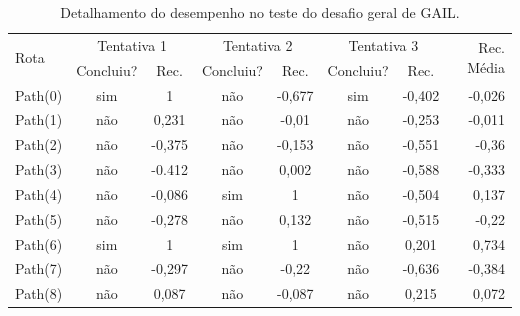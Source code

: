 \begin{table}[htpb]
    \centering
    \caption{Detalhamento do desempenho no teste do desafio geral de GAIL.}
    \label{resultado-tabela-geral-gail}
    \begin{tabular}{|l|c|c|c|c|c|c|r|}
         \hline
         \multirow{2}{*}{Rota} & \multicolumn{2}{c|}{Tentativa 1}  & \multicolumn{2}{c|}{Tentativa 2} & \multicolumn{2}{c|}{Tentativa 3} & \multirow{2}{*}{Rec. Média} \\ \cline{2-7}
                               & \small{Concluiu?}  & \small{Rec.} & \small{Concluiu?} &\small{Rec.} & \small{Concluiu?} &\small{Rec.} &                               \\ \hline
            Path(0)            &      sim          &   1          &    não            &      -0,677 &    sim            &      -0,402 &      -0,026                    \\ \hline
            Path(1)            &      não          &   0,231      &    não            &      -0,01  &    não            &      -0,253 &      -0,011                    \\ \hline
            Path(2)            &      não          &   -0,375     &    não            &      -0,153 &    não            &      -0,551 &      -0,36                     \\ \hline
            Path(3)            &      não          &   -0.412     &    não            &      0,002  &    não            &      -0,588 &      -0,333                    \\ \hline
            Path(4)            &      não          &   -0,086     &    sim            &      1      &    não            &      -0,504 &      0,137                     \\ \hline
            Path(5)            &      não          &   -0,278     &    não            &      0,132  &    não            &      -0,515 &      -0,22                     \\ \hline
            Path(6)            &      sim          &   1          &    sim            &      1      &    não            &      0,201  &      0,734                     \\ \hline
            Path(7)            &      não          &   -0,297     &    não            &      -0,22  &    não            &      -0,636 &      -0,384                    \\ \hline
            Path(8)            &      não          &   0,087      &    não            &      -0,087 &    não            &      0,215  &      0,072                     \\ \hline

\end{tabular}
\end{table}
